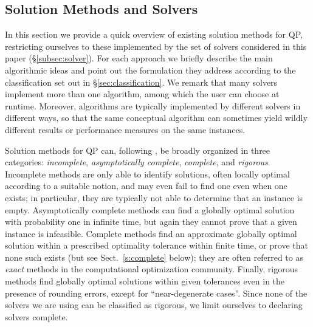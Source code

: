 
\subsection{Solution Methods and Solvers}\label{sec:algo}

In this section we provide a quick overview of existing solution methods for QP, restricting ourselves to these implemented by the set of solvers considered in this paper (\S\ref{subsec:solver}). For each approach we briefly describe the main algorithmic ideas and point out the formulation they address according to the classification set out in \S\ref{sec:classification}. We remark that many solvers implement more than one algorithm, among which the user can choose at runtime. Moreover, algorithms are typically implemented by different solvers in different ways, so that the same conceptual algorithm can sometimes yield wildly different results or performance measures on the same instances.

Solution methods for QP can, following \cite{neumaier}, be broadly organized in three categories: \emph{incomplete}, \emph{asymptotically complete}, \emph{complete}, and \emph{rigorous}. Incomplete methods are only able to identify solutions, often locally optimal according to a suitable notion, and may even fail to find one even when one exists; in particular, they are typically not able to determine that an instance is empty. Asymptotically complete methods can find a globally optimal solution with probability one in infinite time, but again they cannot prove that a given instance is infeasible. Complete methods find an approximate globally optimal solution within a prescribed optimality tolerance within finite time, or prove that none such exists (but see Sect.~\ref{s:complete} below); they are often referred to as \emph{exact} methods in the computational optimization community. Finally, rigorous methods find globally optimal solutions within given tolerances even in the presence of rounding errors, except for ``near-degenerate cases''. Since none of the solvers we are using can be classified as rigorous, we limit ourselves to declaring solvers complete.

